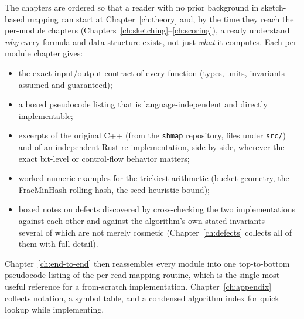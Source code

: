The chapters are ordered so that a reader with no prior background in sketch-based mapping can
start at Chapter~\ref{ch:theory} and, by the time they reach the per-module chapters
(Chapters~\ref{ch:sketching}--\ref{ch:scoring}), already understand \emph{why} every formula and
data structure exists, not just \emph{what} it computes. Each per-module chapter gives:
\begin{itemize}[nosep]
  \item the exact input/output contract of every function (types, units, invariants assumed and
    guaranteed);
  \item a boxed pseudocode listing that is language-independent and directly implementable;
  \item excerpts of the original C++ (from the \texttt{shmap} repository, files under
    \texttt{src/}) and of an independent Rust re-implementation, side by side, wherever the exact
    bit-level or control-flow behavior matters;
  \item worked numeric examples for the trickiest arithmetic (bucket geometry, the FracMinHash
    rolling hash, the seed-heuristic bound);
  \item boxed notes on defects discovered by cross-checking the two implementations against each
    other and against the algorithm's own stated invariants --- several of which are not merely
    cosmetic (Chapter~\ref{ch:defects} collects all of them with full detail).
\end{itemize}

Chapter~\ref{ch:end-to-end} then reassembles every module into one top-to-bottom pseudocode
listing of the per-read mapping routine, which is the single most useful reference for a
from-scratch implementation. Chapter~\ref{ch:appendix} collects notation, a symbol table, and a
condensed algorithm index for quick lookup while implementing.
